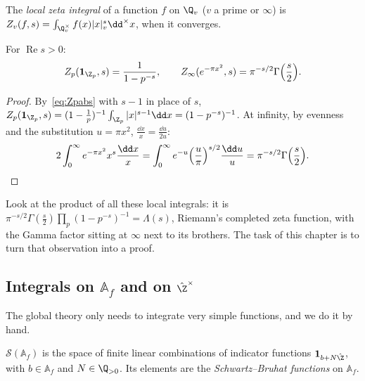 \begin{definition}
The \emph{local zeta integral} of a function $f$ on $\Q_v$ ($v$ a prime or $\infty$) is
$Z_v(f,s)=\int_{\Q_v^\times}f(x)|x|_v^s\dd^\times x$, when it converges.
\end{definition}

\begin{proposition}\label{prop:localzeta}
For $\operatorname{Re}s>0$:
\[
Z_p(\mathbf 1_{\Z_p},s)=\frac1{1-p^{-s}},\qquad Z_\infty(e^{-\pi x^2},s)=\pi^{-s/2}\Gamma\Bigl(\frac s2\Bigr).
\]
\end{proposition}
\begin{proof}
By~\eqref{eq:Zpabs} with $s-1$ in place of $s$, $Z_p(\mathbf 1_{\Z_p},s)=(1-\frac1p)^{-1}\int_{\Z_p}|x|^{s-1}\dd x=(1-p^{-s})^{-1}$. At
infinity, by evenness and the substitution $u=\pi x^2$, $\frac{\dd x}x=\frac{\dd u}{2u}$:
\[
2\int_0^\infty e^{-\pi x^2}x^s\frac{\dd x}x=\int_0^\infty e^{-u}\Bigl(\frac u\pi\Bigr)^{s/2}\frac{\dd u}u=\pi^{-s/2}\Gamma\Bigl(\frac s2\Bigr).
\]
\end{proof}

Look at the product of all these local integrals: it is $\pi^{-s/2}\Gamma(\frac s2)\prod_p(1-p^{-s})^{-1}=\Lambda(s)$, Riemann's completed
zeta function, with the Gamma factor sitting at $\infty$ next to its brothers. The task of this chapter is to turn that observation
into a proof.

\subsection*{Integrals on \texorpdfstring{$\mathbb{A}_f$}{A\_f} and on \texorpdfstring{$\hat{\Z}^\times$}{Z-hat-times}}

The global theory only needs to integrate very simple functions, and we do it by hand.

\begin{definition}
$\mathcal S(\mathbb{A}_f)$ is the space of finite linear combinations of indicator functions $\mathbf 1_{b+N\hat{\Z}}$, with $b\in\mathbb{A}_f$ and $N\in\Q_{>0}$.
Its elements are the \emph{Schwartz--Bruhat functions} on $\mathbb{A}_f$.
\end{definition}

